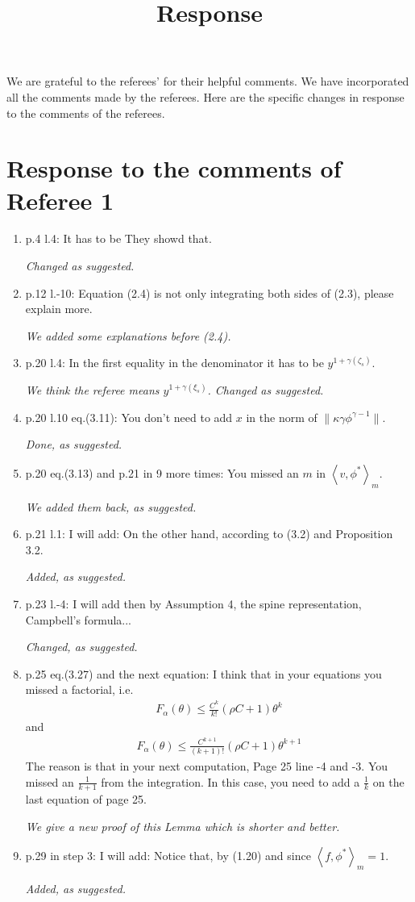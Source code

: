 \documentclass[12pt,a4paper]{amsart}
\numberwithin{equation}{section}
\theoremstyle{plain}
\theoremstyle{definition}
\begin{document}
\title
[Response]
{Response}
\maketitle
We are grateful to the referees' for their helpful comments.
We have incorporated all the comments made by the referees.
Here are the specific changes in response to the comments of the referees.
\section*{Response to the comments of Referee 1}
\begin{enumerate}
\item
  p.4 l.4: It has to be They showd that. 

  {\it Changed as suggested.}
\item
  p.12 l.-10: Equation (2.4) is not only integrating both sides of (2.3), please explain more.
  
  {\it We added some explanations before (2.4).}
\item
  p.20 l.4: In the first equality in the denominator it has to be $y^{1+\gamma(\zeta_s)}$.
  
  {\it We think the referee means $y^{1+\gamma(\xi_s)}$.
    Changed as suggested. }
\item
  p.20 l.10 eq.(3.11): You don't need to add $x$ in the norm of $\|\kappa \gamma \phi^{\gamma - 1}\|$.
  
  {\it Done, as suggested.}
\item
  p.20 eq.(3.13) and p.21 in 9 more times: You missed an $m$ in $\left\langle v, \phi^* \right\rangle_m$.
  
  {\it We added them back, as suggested.}
\item
  p.21 l.1: I will add: On the other hand, according to (3.2) and Proposition 3.2.
  
  {\it Added, as suggested.}
\item
  p.23 l.-4: I will add then by Assumption 4, the spine representation, Campbell's formula...
  
  {\it Changed, as suggested.}
\item
  p.25 eq.(3.27) and the next equation: I think that in your equations you missed a factorial, i.e.
  \begin{align}
    F_\alpha(\theta) 
    \leq \frac{C^k}{k!} \left( \rho C+1 \right) \theta^k 
  \end{align}
  and
  \begin{align}
    F_\alpha(\theta) 
    \leq \frac{C^{k+1}}{(k+1)!} \left( \rho  C+1 \right) \theta^{k+1}
  \end{align}
  The reason is that in your next computation, Page 25 line -4 and -3. You missed an $\frac{1}{k+1}$ from the integration. 
  In this case, you need to add a $\frac{1}{k}$ on the last equation of page 25.
    
  {\it We give a new proof of this Lemma which is shorter and better.}
\item
  p.29 in step 3: I will add: Notice that, by (1.20) and since $\left\langle f, \phi^* \right\rangle_m = 1$.
  
  {\it Added, as suggested.}
\end{enumerate}
\end{document}
